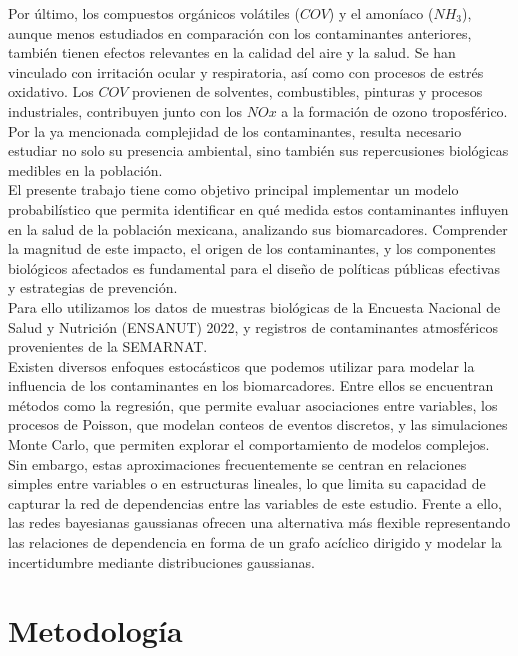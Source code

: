 \documentclass[12pt, letterpaper]{report}
\begin{document}
Por último, los compuestos orgánicos volátiles ($COV$) y el amoníaco ($NH_3$), aunque menos estudiados en comparación con los contaminantes anteriores, también tienen efectos relevantes en la calidad del aire y la salud. Se han vinculado con irritación ocular y respiratoria, así como con procesos de estrés oxidativo. \cite{atsdr2026} Los $COV$ provienen de solventes, combustibles, pinturas y procesos industriales, contribuyen junto con los $NOx$ a la formación de ozono troposférico. \cite{epa2025}
\\

Por la ya mencionada complejidad de los contaminantes, resulta necesario estudiar no solo su presencia ambiental, sino también sus repercusiones biológicas medibles en la población.
\\

El presente trabajo tiene como objetivo principal implementar un modelo probabilístico que permita identificar en qué medida estos contaminantes influyen en la salud de la población mexicana, analizando sus biomarcadores. Comprender la magnitud de este impacto, el origen de los contaminantes, y los componentes biológicos afectados es fundamental para el diseño de políticas públicas efectivas y estrategias de prevención.
\\

Para ello utilizamos los datos de muestras biológicas de la Encuesta Nacional de Salud y Nutrición (ENSANUT) 2022, y registros de contaminantes atmosféricos provenientes de la SEMARNAT.
\\

Existen diversos enfoques estocásticos que podemos utilizar para modelar la influencia de los contaminantes en los biomarcadores. Entre ellos se encuentran métodos como la regresión, que permite evaluar asociaciones entre variables, los procesos de Poisson, que modelan conteos de eventos discretos, y las simulaciones Monte Carlo, que permiten explorar el comportamiento de modelos complejos. Sin embargo, estas aproximaciones frecuentemente se centran en relaciones simples entre variables o en estructuras lineales, lo que limita su capacidad de capturar la red de dependencias entre las variables de este estudio. Frente a ello, las redes bayesianas gaussianas ofrecen una alternativa más flexible representando las relaciones de dependencia en forma de un grafo acíclico dirigido y modelar la incertidumbre mediante distribuciones gaussianas.

\section*{Metodología}
\end{document}
